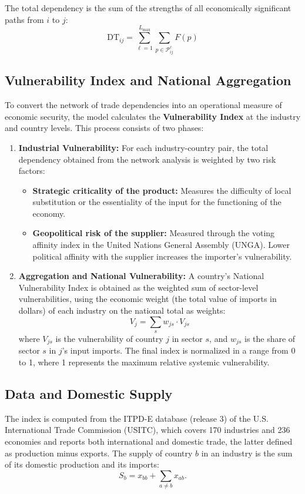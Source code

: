 \documentclass[final,1p,times,authoryear]{elsarticle}
\begin{document}
The total dependency is the sum of the strengths of all economically significant paths from $i$ to $j$:
\begin{equation}
\text{DT}_{ij} = \sum_{\ell=1}^{L_{\max}} \sum_{p \in \mathcal{P}_{ij}^{\ell}} F(p)
\end{equation}

\subsection{Vulnerability Index and National Aggregation}
To convert the network of trade dependencies into an operational measure of economic security, the model calculates the \textbf{Vulnerability Index} at the industry and country levels. This process consists of two phases:

\begin{enumerate}
    \item \textbf{Industrial Vulnerability:} For each industry-country pair, the total dependency obtained from the network analysis is weighted by two risk factors:
    \begin{itemize}
        \item \textbf{Strategic criticality of the product:} Measures the difficulty of local substitution or the essentiality of the input for the functioning of the economy.
        \item \textbf{Geopolitical risk of the supplier:} Measured through the voting affinity index in the United Nations General Assembly (UNGA). Lower political affinity with the supplier increases the importer's vulnerability.
    \end{itemize}
    
    \item \textbf{Aggregation and National Vulnerability:} A country's National Vulnerability Index is obtained as the weighted sum of sector-level vulnerabilities, using the economic weight (the total value of imports in dollars) of each industry on the national total as weights:
    \begin{equation}
    V_j = \sum_{s} w_{js} \cdot V_{js}
    \end{equation}
    where $V_{js}$ is the vulnerability of country $j$ in sector $s$, and $w_{js}$ is the share of sector $s$ in $j$'s input imports. The final index is normalized in a range from 0 to 1, where 1 represents the maximum relative systemic vulnerability.
\end{enumerate}

\subsection{Data and Domestic Supply}\label{subsec:data}
The index is computed from the ITPD-E database (release 3) of the U.S. International Trade Commission (USITC), which covers 170 industries and 236 economies and reports both international and domestic trade, the latter defined as production minus exports. The supply of country $b$ in an industry is the sum of its domestic production and its imports:
\begin{equation}
S_b = x_{bb} + \sum_{a \neq b} x_{ab}.
\end{equation}
\end{document}

